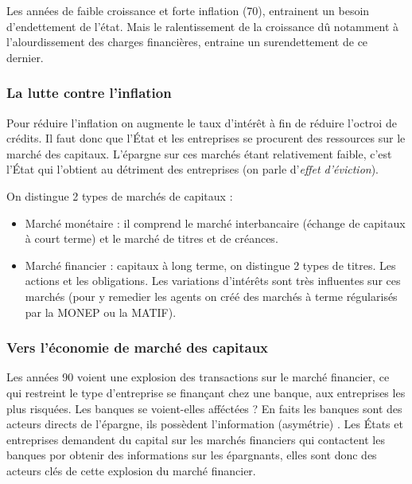 Les années de faible croissance et forte inflation (70), entrainent un besoin d'endettement de l'état. Mais le ralentissement de la croissance dû notamment à 
l'alourdissement des charges financières, entraine un surendettement de ce dernier.

\subsubsection{La lutte contre l'inflation} %
\label{sub:la_lutte_contre_l_inflation}

Pour réduire l'inflation on augmente le taux d'intérêt à fin de réduire l'octroi de crédits. Il faut donc que l'État et les entreprises se procurent des 
ressources sur le marché des capitaux. L'épargne sur ces marchés étant relativement faible, c'est l'État qui l'obtient au détriment des entreprises (on parle
d'\emph{effet d'éviction}).

On distingue 2 types de marchés de capitaux : 
\begin{itemize}[label=]
	\item Marché monétaire : il comprend le marché interbancaire (échange de capitaux à court terme) et le marché de titres et de créances.
	\item Marché financier : capitaux à long terme, on distingue 2 types de titres. Les actions et les obligations. Les variations d'intérêts sont très influentes sur ces marchés (pour y remedier les agents on créé des marchés à terme régularisés par la MONEP ou la MATIF).
\end{itemize}


\subsubsection{Vers l'économie de marché des capitaux} %
\label{sub:vers_l_economie_de_marche_des_capitaux}

Les années 90 voient une explosion des transactions sur le marché financier, ce qui restreint le type d'entreprise se finançant chez une banque, aux entreprises
les plus risquées. Les banques se voient-elles afféctées ? En faits les banques sont des acteurs directs de l'épargne, ils possèdent l'information (asymétrie)
. Les États et entreprises demandent du capital sur les marchés financiers qui contactent les banques por obtenir des informations sur les épargnants, elles 
sont donc des acteurs clés de cette explosion du marché financier.

